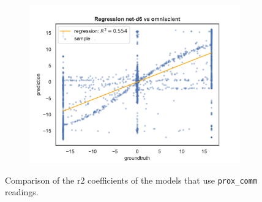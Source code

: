 \begin{figure}[!htb]
\begin{center}
\begin{subfigure}[h]{0.49\textwidth}
		\end{subfigure}
	\end{center}
	\begin{center}
		\begin{subfigure}[h]{0.49\textwidth}
			\includegraphics[width=\textwidth]{contents/images/net-d6/regression-net-d6-vs-omniscient}
		\end{subfigure}
	\end{center}
	\caption[Comparison of the \gls{r2} coefficients for \texttt{prox\_comm} 
	readings.]{Comparison of the \gls{r2} coefficients of the models that use 
	\texttt{prox\_comm} readings.}
	\label{fig:net-d456r2}
\end{figure}
